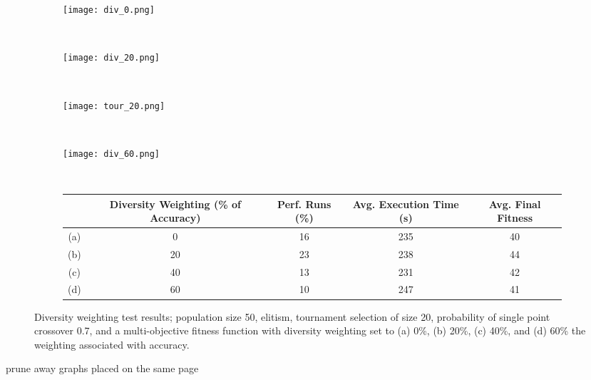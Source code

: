 \begin{figure}
	\centering
	\begin{subfigure}[ht]{0.49\textwidth}
		\texttt{[image: div\_0.png]}
		\caption{}
		\label{fig:div_0}
		\vspace{1em}
	\end{subfigure}
	~
	\begin{subfigure}[ht]{0.49\textwidth}
		\texttt{[image: div\_20.png]}
		\caption{}
		\vspace{1em}
		\label{fig:div_2}
	\end{subfigure}
	~
	\begin{subfigure}[ht]{0.49\textwidth}
		\texttt{[image: tour\_20.png]}
		\caption{}
		\vspace{1em}
	\end{subfigure}
	~
	\begin{subfigure}[ht]{0.49\textwidth}
		\texttt{[image: div\_60.png]}
		\caption{}
		\vspace{1em}
		\label{fig:div_6}
	\end{subfigure}
	~
	\begin{subfigure}[ht]{\textwidth}
		\centering
		\begin{tabular}{ccccc}
			\toprule
			& \bfseries{Diversity Weighting (\% of Accuracy)} &
			\bfseries{Perf. Runs (\%)} &
			\bfseries{Avg. Execution Time (s)} & \bfseries{Avg. Final Fitness}\\
			\midrule
			(a) & 0 & 16 & 235 & 40\\
			(b) & 20 & 23 & 238 & 44\\
			(c) & 40 & 13 & 231 & 42\\
			(d) & 60 & 10 & 247 & 41\\
			\bottomrule
		\end{tabular}
	\end{subfigure}

	\caption[Diversity weighting test results]{Diversity weighting test results;
	population size 50, elitism, tournament selection of size 20, probability
	of single point crossover 0.7, and a multi-objective fitness function with
	diversity weighting set to (a) 0\%, (b) 20\%, (c) 40\%, and (d) 60\% the weighting
	associated with accuracy.}
	\label{fig:div}
\end{figure}

\todo prune away graphs placed on the same page

